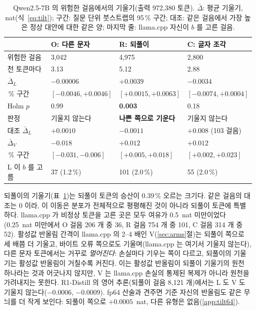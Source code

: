 \documentclass[11pt]{article}
\begin{document}
\begin{table}[t]
\centering
\small
\caption{Qwen2.5-7B 의 위험한 걸음에서의 기울기(출력 972,380 토큰). $\bar{\Delta}$: 평균 기울기, nat(식~\ref{eq:tilt}); 구간: 질문
단위 붓스트랩의 95\,\% 구간; 대조: 같은 걸음에서 가장 높은 정상 대안에 대한 같은 양; 마지막 줄: llama.cpp 자신이 $b$ 를 고른 걸음.}
\label{tab:tilt}
\begin{tabular}{@{}l lll@{}}
\toprule
 & O: 다른 문자 & R: 되풀이 & C: 글자 조각 \\
\midrule
위험한 걸음 & 3,042 & 4,975 & 2,800 \\
\quad 천 토큰마다 & 3.13 & 5.12 & 2.88 \\
\addlinespace
$\bar{\Delta}_L$ & $-0.00006$ & $\mathbf{+0.0039}$ & $-0.0034$ \\
\quad 95\,\% 구간 & $[-0.0046, +0.0046]$ & $\mathbf{[+0.0015, +0.0063]}$ & $[-0.0074, +0.0004]$ \\
\quad Holm $p$ & 0.99 & \textbf{0.003} & 0.18 \\
\quad 판정 & 기울지 않는다 & \textbf{나쁜 쪽으로 기운다} & 기울지 않는다 \\
\quad 대조 $\bar{\Delta}_L$ & $+0.0010$ & $-0.0011$ & $+0.008$ (103 걸음) \\
\addlinespace
$\bar{\Delta}_V$ & $-0.018$ & $+0.012$ & $+0.012$ \\
\quad 95\,\% 구간 & $[-0.031, -0.006]$ & $[+0.005, +0.018]$ & $[+0.002, +0.023]$ \\
\addlinespace
L 이 $b$ 를 고름 & 37 (1.2\,\%) & 101 (2.0\,\%) & 55 (2.0\,\%) \\
\bottomrule
\end{tabular}
\end{table}

되풀이의 기울기(표~\ref{tab:tilt})는 되풀이 토큰의 승산이 0.39\,\% 오르는 크기다. 같은 걸음의 대조는 0 이라, 이 이동은 분포가
전체적으로 평평해진 것이 아니라 되풀이 토큰에 특별하다. llama.cpp 가 비정상 토큰을 고른 곳은 모두 여유가 0.5~nat
미만이었다(0.25~nat 미만에서 O 걸음 206 개 중 36, R 걸음 754 개 중 101, C 걸음 314 개 중 52). 활성값 반올림 간격이 llama.cpp 의
2--4 배인 V(\ref{sec:arms}절)는 되풀이 쪽으로 세 배쯤 더 기울고, 바이트 오류 쪽으로도 기울며(llama.cpp 는 여기서 기울지 않는다),
다른 문자 토큰에서는 거꾸로 \emph{멀어진다}: 손실마다 기우는 쪽이 다르고, 되풀이의 기울기는 활성값 반올림이 거칠수록 커진다.
이는 활성값 반올림이 되풀이 기울기의 원천 하나라는 것과 어긋나지 않지만, V 는 llama.cpp 손실의 통제된 복제가 아니라 원천을
가려내지는 못한다. R1-Distill 의 영어 추론(되풀이 걸음 8,121 개)에서는 L 도 V 도 기울지 않는다($-0.0006$, $-0.0009$). fp64 산술과 견주면 기준
자신의 반올림도 같은 무늬를 더 작게 보인다: 되풀이 쪽으로 $+0.0005$~nat, 다른 유형은 없음(\ref{app:tilt64}).
\end{document}
